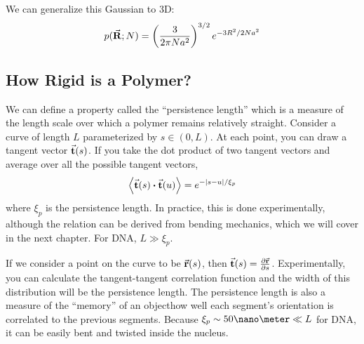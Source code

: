 \documentclass[a4paper,twoside,master.tex]{subfiles}
\begin{document}
We can generalize this Gaussian to 3D:
\begin{equation}
    p(\va{R};N) = \left( \frac{3}{2 \pi N a^2} \right)^{3/2} e^{-3R^2 / 2Na^2}
\end{equation}

\subsection{How Rigid is a Polymer?}\label{sub:how_rigid_is_a_polymer}

We can define a property called the ``persistence length'' which is a measure of the length scale over which a polymer remains relatively straight. Consider a curve of length $ L $ parameterized by $ s \in (0,L) $. At each point, you can draw a tangent vector $ \va{t}(s) $. If you take the dot product of two tangent vectors and average over all the possible tangent vectors,
\begin{equation}
    \ev{\va{t}(s) \vdot \va{t}(u)} = e^{- \abs{s-u} / \xi_p}
\end{equation}
where $ \xi_p $ is the persistence length. In practice, this is done experimentally, although the relation can be derived from bending mechanics, which we will cover in the next chapter. For DNA, $ L\gg \xi_p $.

If we consider a point on the curve to be $ \va{r}(s) $, then $ \va{t}(s) = \pdv{\va{r}}{s} $. Experimentally, you can calculate the tangent-tangent correlation function and the width of this distribution will be the persistence length. The persistence length is also a measure of the ``memory'' of an object\textemdash how well each segment's orientation is correlated to the previous segments. Because $ \xi_p \sim 50\nano\meter \ll L $ for DNA, it can be easily bent and twisted inside the nucleus.
\end{document}
